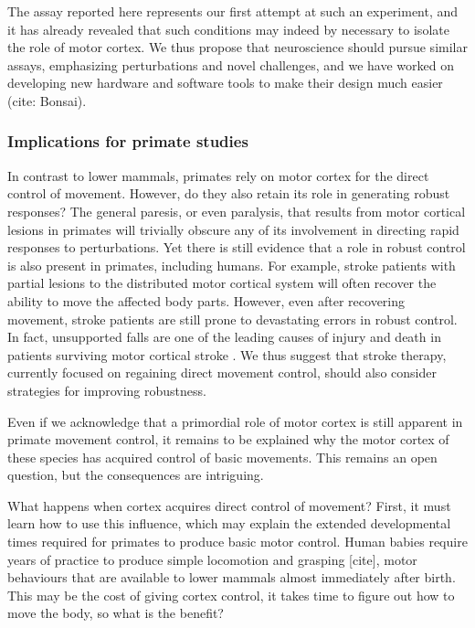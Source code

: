 The assay reported here represents our first attempt at such an experiment, and it has already revealed that such conditions may indeed by necessary to isolate the role of motor cortex. We thus propose that neuroscience should pursue similar assays, emphasizing perturbations and novel challenges, and we have worked on developing new hardware and software tools to make their design much easier (cite: Bonsai).

\subsubsection*{Implications for primate studies}

In contrast to lower mammals, primates rely on motor cortex for the direct control of movement. However, do they also retain its role in generating robust responses? The general paresis, or even paralysis, that results from motor cortical lesions in primates will trivially obscure any of its involvement in directing rapid responses to perturbations. Yet there is still evidence that a role in robust control is also present in primates, including humans. For example, stroke patients with partial lesions to the distributed motor cortical system will often recover the ability to move the affected body parts. However, even after recovering movement, stroke patients are still prone to devastating errors in robust control. In fact, unsupported falls are one of the leading causes of injury and death in patients surviving motor cortical stroke \cite{Jacobs2014}. We thus suggest that stroke therapy, currently focused on regaining direct movement control, should also consider strategies for improving robustness.

Even if we acknowledge that a primordial role of motor cortex is still apparent in primate movement control, it remains to be explained why the motor cortex of these species has acquired control of basic movements. This remains an open question, but the consequences are intriguing.


What happens when cortex acquires direct control of movement? First, it must learn how to use this influence, which may explain the extended developmental times required for primates to produce basic motor control. Human babies require years of practice to produce simple locomotion and grasping [cite], motor behaviours that are available to lower mammals almost immediately after birth. This may be the cost of giving cortex control, it takes time to figure out how to move the body, so what is the benefit? 

